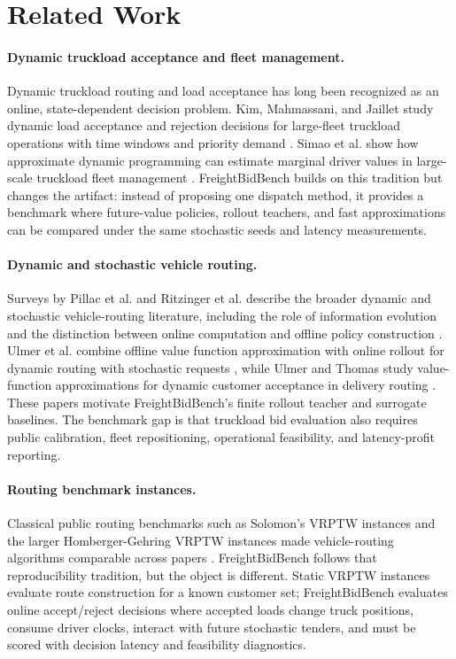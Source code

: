 \documentclass[11pt]{article}
\begin{document}
\section{Related Work}

\paragraph{Dynamic truckload acceptance and fleet management.}
Dynamic truckload routing and load acceptance has long been recognized as an
online, state-dependent decision problem. Kim, Mahmassani, and Jaillet study
dynamic load acceptance and rejection decisions for large-fleet truckload
operations with time windows and priority demand \citep{kim2004dynamic}.
Simao et al. show how approximate dynamic programming can estimate marginal
driver values in large-scale truckload fleet management \citep{simao2009adp}.
FreightBidBench builds on this tradition but changes the artifact: instead of
proposing one dispatch method, it provides a benchmark where future-value
policies, rollout teachers, and fast approximations can be compared under the
same stochastic seeds and latency measurements.

\paragraph{Dynamic and stochastic vehicle routing.}
Surveys by Pillac et al. and Ritzinger et al. describe the broader dynamic and
stochastic vehicle-routing literature, including the role of information
evolution and the distinction between online computation and offline policy
construction \citep{pillac2013review,ritzinger2016survey}. Ulmer et al.
combine offline value function approximation with online rollout for dynamic
routing with stochastic requests \citep{ulmer2019offline}, while Ulmer and
Thomas study value-function approximations for dynamic customer acceptance in
delivery routing \citep{ulmer2020meso}. These papers motivate
FreightBidBench's finite rollout teacher and surrogate baselines. The
benchmark gap is that truckload bid evaluation also requires public
calibration, fleet repositioning, operational feasibility, and latency-profit
reporting.

\paragraph{Routing benchmark instances.}
Classical public routing benchmarks such as Solomon's VRPTW instances and the
larger Homberger-Gehring VRPTW instances made vehicle-routing algorithms
comparable across papers \citep{solomon1987vrptw,homberger2005vrptw}.
FreightBidBench follows that reproducibility tradition, but the object is
different. Static VRPTW instances evaluate route construction for a known
customer set; FreightBidBench evaluates online accept/reject decisions where
accepted loads change truck positions, consume driver clocks, interact with
future stochastic tenders, and must be scored with decision latency and
feasibility diagnostics.
\end{document}
